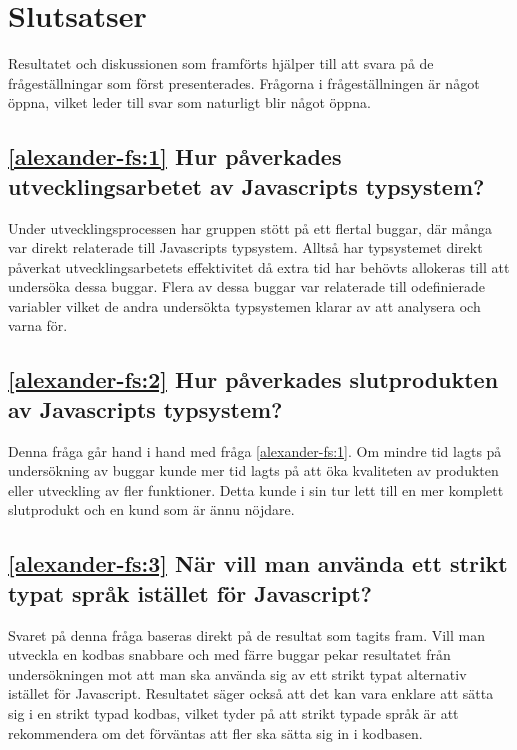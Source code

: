 \section{Slutsatser}
\label{sec:alexander-conclusion}

Resultatet och diskussionen som framförts hjälper till att svara på de frågeställningar som först presenterades.  Frågorna i frågeställningen är något öppna, vilket leder till svar som naturligt blir något öppna.

\subsection*{\ref{alexander-fs:1} Hur påverkades utvecklingsarbetet av Javascripts typsystem?}
Under utvecklingsprocessen har gruppen stött på ett flertal buggar, där många var direkt relaterade till Javascripts typsystem. Alltså har typsystemet direkt påverkat utvecklingsarbetets effektivitet då extra tid har behövts allokeras till att undersöka dessa buggar. Flera av dessa buggar var relaterade till odefinierade variabler vilket de andra undersökta typsystemen klarar av att analysera och varna för.

\subsection*{\ref{alexander-fs:2} Hur påverkades slutprodukten av Javascripts typsystem?}
Denna fråga går hand i hand med fråga \ref{alexander-fs:1}. Om mindre tid lagts på undersökning av buggar kunde mer tid lagts på att öka kvaliteten av produkten eller utveckling av fler funktioner. Detta kunde i sin tur lett till en mer komplett slutprodukt och en kund som är ännu nöjdare.

\subsection*{\ref{alexander-fs:3} När vill man använda ett strikt typat språk istället för Javascript?}
Svaret på denna fråga baseras direkt på de resultat som tagits fram. Vill man utveckla en kodbas snabbare och med färre buggar pekar resultatet från undersökningen mot att man ska använda sig av ett strikt typat alternativ istället för Javascript. Resultatet säger också att det kan vara enklare att sätta sig i en strikt typad kodbas, vilket tyder på att strikt typade språk är att rekommendera om det förväntas att fler ska sätta sig in i kodbasen.  
